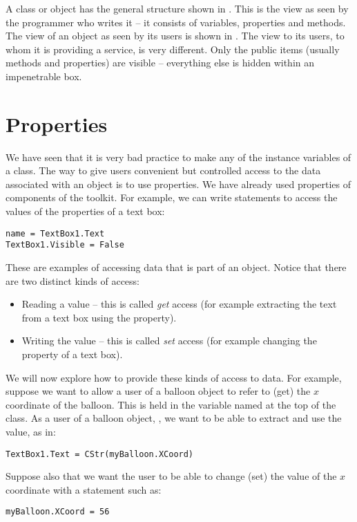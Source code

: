 		A class or object has the general structure shown in . This is the view as seen by the programmer who writes it – it consists of variables, properties and methods. The view of an object as seen by its users is shown in . The view to its users, to whom it is providing a service, is very different. Only the public items (usually methods and properties) are visible – everything else is hidden within an impenetrable box.

		
	\section{Properties}
		We have seen that it is very bad practice to make  any of the instance variables of a class. The way to give users convenient but controlled access to the data associated with an object is to use properties. We have already used properties of components of the toolkit. For example, we can write statements to access the values of the properties of a text box:
		\begin{lstlisting}
name = TextBox1.Text
TextBox1.Visible = False
		\end{lstlisting}
		These are examples of accessing data that is part of an object. Notice that there are two distinct kinds of access:
		\begin{itemize}
			\item Reading a value – this is called \emph{get} access (for example extracting the text from a text box using the  property).
			\item Writing the value – this is called \emph{set} access (for example changing the  property of a text box).
		\end{itemize}
		We will now explore how to provide these kinds of access to data. For example, suppose we want to allow a user of a balloon object to refer to (get) the $x$ coordinate of the balloon. This is held in the variable named  at the top of the class. As a user of a balloon object, , we want to be able to extract and use the value, as in:
		\begin{lstlisting}
TextBox1.Text = CStr(myBalloon.XCoord)
		\end{lstlisting}
		Suppose also that we want the user to be able to change (set) the value of the $x$ coordinate with a statement such as:
		\begin{lstlisting}
myBalloon.XCoord = 56
		\end{lstlisting}
